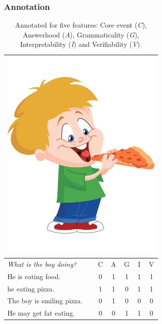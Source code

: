 \documentclass[handout,xcolor={dvipsnames}]{beamer}
\begin{document}
\begin{frame}
\frametitle{Annotation}
\begin{table}[htb!]
\small
\begin{center}
\begin{tabular}{|l|c|c|c|c|c|}
\hline
\multicolumn{6}{|c|}{\includegraphics[width=0.25\columnwidth]{figures/I02.jpg}} \\
\hline
\textit{What is the boy doing?} & C & A & G & I & V \\
\hline
\hline
He is eating food. & 0 & 1 & 1 & 1 & 1 \\
\hline
he eating pizza. & 1 & 1 & 0 & 1 & 1 \\
\hline
The boy is smiling pizza. & 0 & 1 & 0 & 0 & 0 \\
\hline
He may get fat eating. & 0 & 0 & 1 & 1 & 0 \\
\hline
\end{tabular}
\caption{\label{tab:dev-transitive} \small Annotated for five features: Core event (\textit{C}), Answerhood (\textit{A}), Grammaticality (\textit{G}), Interpretability (\textit{I}) and Verifiability (\textit{V}).}
\end{center}
\end{table}
\end{frame}
\end{document}
